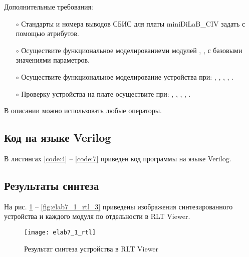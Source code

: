 Дополнительные требования:
\begin{itemize}
	\item[$\circ$] Стандарты и номера выводов СБИС для платы miniDiLaB\_CIV задать с помощью атрибутов.
	\item[$\circ$] Осуществите функциональное моделированиеми  модулей , ,  с базовыми значениями параметров.
	\item[$\circ$] Осуществите функциональное моделирование устройства при: , , , , .
	\item[$\circ$] Проверку устройства на плате осуществите при: , , , , .
\end{itemize}
В описании можно использовать любые операторы.

\newpage

\subsection{Код на языке Verilog}

В листингах \ref{code:4} -- \ref{code:7} приведен код программы на языке Verilog.



\newpage





\newpage



\newpage

\subsection{Результаты синтеза}

На рис. \ref{fig:elab7_1_rtl} -- \ref{fig:elab7_1_rtl_3} приведены изображения синтезированного устройства и каждого модуля по отдельности в RLT Viewer.

\begin{figure}[H]
\begin{center}
	\texttt{[image: elab7\_1\_rtl]}
	\caption{Результат синтеза устройства в RLT Viewer}
	\label{fig:elab7_1_rtl}
\end{center}
\end{figure}


